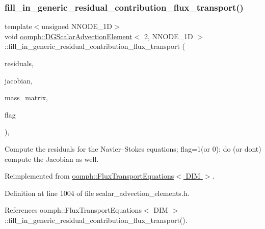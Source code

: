 \subsubsection{\texorpdfstring{fill\+\_\+in\+\_\+generic\+\_\+residual\+\_\+contribution\+\_\+flux\+\_\+transport()}{fill\_in\_generic\_residual\_contribution\_flux\_transport()}}
{\footnotesize\ttfamily template$<$unsigned N\+N\+O\+D\+E\+\_\+1D$>$ \\
void \hyperlink{classoomph_1_1DGScalarAdvectionElement}{oomph\+::\+D\+G\+Scalar\+Advection\+Element}$<$ 2, N\+N\+O\+D\+E\+\_\+1D $>$\+::fill\+\_\+in\+\_\+generic\+\_\+residual\+\_\+contribution\+\_\+flux\+\_\+transport (\begin{DoxyParamCaption}\item[{\hyperlink{classoomph_1_1Vector}{Vector}$<$ double $>$ \&}]{residuals,  }\item[{\hyperlink{classoomph_1_1DenseMatrix}{Dense\+Matrix}$<$ double $>$ \&}]{jacobian,  }\item[{\hyperlink{classoomph_1_1DenseMatrix}{Dense\+Matrix}$<$ double $>$ \&}]{mass\+\_\+matrix,  }\item[{unsigned}]{flag }\end{DoxyParamCaption})\hspace{0.3cm}{\ttfamily [inline]}, {\ttfamily [virtual]}}



Compute the residuals for the Navier--Stokes equations; flag=1(or 0)\+: do (or don\textquotesingle{}t) compute the Jacobian as well. 



Reimplemented from \hyperlink{classoomph_1_1FluxTransportEquations_a6994eab818eb7236e24e45b6fedec1f7}{oomph\+::\+Flux\+Transport\+Equations$<$ D\+I\+M $>$}.



Definition at line 1004 of file scalar\+\_\+advection\+\_\+elements.\+h.



References oomph\+::\+Flux\+Transport\+Equations$<$ D\+I\+M $>$\+::fill\+\_\+in\+\_\+generic\+\_\+residual\+\_\+contribution\+\_\+flux\+\_\+transport().

\mbox{\label{classoomph_1_1DGScalarAdvectionElement_3_012_00_01NNODE__1D_01_4_a316a94ee11fe6fe52e25a2eec1b4a1c8}} 
